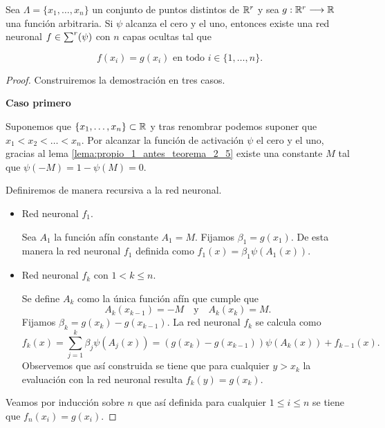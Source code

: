 \begin{teorema}
    Sea $ \Lambda = \{x_1, \ldots, x_n\}$ un conjunto de puntos distintos de 
    $\mathbb{R}^r$ y sea 
    $g: \mathbb{R}^r \longrightarrow \mathbb{R}$ una función arbitraria. 
    Si $\psi$ alcanza el cero y el uno, 
    entonces
    existe una red neuronal $f \in \sum^r (\psi)$ con $n$
    capas ocultas tal que 

    \begin{equation}
        f(x_i) = g(x_i) \text{ en todo } i \in \{1, \ldots, n \}.
    \end{equation}
\end{teorema}
\begin{proof}
Construiremos la demostración en tres casos. 

\textbf{Caso primero}

Suponemos que $\{x_1, \ldots, x_n\} \subset \mathbb{R}$ y tras renombrar 
podemos suponer que $x_1 < x_2 < \ldots < x_n.$ 
Por alcanzar la función de activación $\psi$ el cero y el uno, 
gracias al lema  \ref{lema:propio_1_antes_teorema_2_5} existe una constante $M$ tal que $\psi(-M) = 1-\psi(M) = 0.$

Definiremos de manera recursiva a la red neuronal. 

\begin{itemize}
    \item Red neuronal $f_1$. 

Sea $A_1$ la función afín constante $A_1 = M.$
Fijamos $\beta_1 = g(x_1)$. 
De esta manera la red neuronal $f_1$ 
definida como $f_1(x) = \beta_1 \psi(A_1(x)).$

\item Red neuronal $f_k$ con $1 < k \leq n$. 

Se define $A_{k}$ como la única función afín que cumple que 
\begin{equation}
    A_k(x_{k-1}) = -M \quad \text{y} \quad  A_{k}(x_k)= M.
\end{equation}
Fijamos $\beta_k = g(x_k) - g(x_{k-1})$. 
La red neuronal $f_k$ se calcula como 
\begin{equation}
    f_k(x) 
    = 
    \sum_{j=1}^k \beta_j \psi(A_j(x))
     = 
    (g(x_k)-g(x_{k-1})) \psi(A_k(x)) + f_{k-1}(x) .  
\end{equation}
Observemos que así construida se tiene que para cualquier
 $y > x_k$ la evaluación con la red neuronal resulta $f_k(y) = g(x_k).$

\end{itemize}
Veamos por inducción sobre $n$ que así definida para cualquier $1 \leq i \leq n$ se tiene que     
$f_n(x_i) = g(x_i)$. 



\end{proof}
